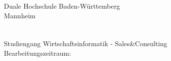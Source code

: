 \thispagestyle{plain}

\begin{titlepage}

	
	\begin{center}
        Duale Hochschule Baden-Württemberg\\
        Mannheim\\
        \vspace*{20mm}	{\large\bf \art}\\
		\vspace*{12mm}	{\LARGE\bf \titel }\\
		\vspace*{12mm}	{\large Studiengang Wirtschaftsinformatik - Sales\&Consulting}\\
        \vspace*{3mm} Bearbeitungszeitraum: \zeitraum\\


\end{center}
\end{titlepage}
